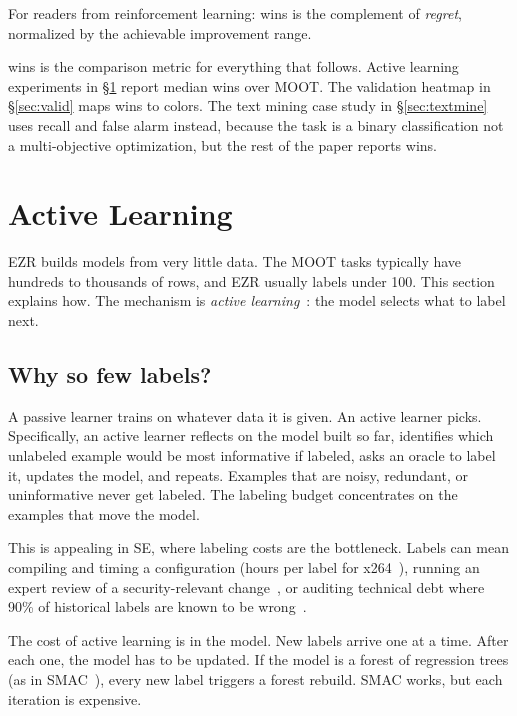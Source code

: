 \documentclass[AMA,STIX2COL]{WileyNJDv5}
\newcommand{\IT}{{\sffamily EZR}}
\begin{document}
For readers from reinforcement learning: \textsf{wins} is the
complement of {\em regret}, normalized by the achievable
improvement range.

\textsf{wins} is the comparison metric for everything that
follows. Active learning experiments in \S\ref{sec:active}
report median \textsf{wins} over MOOT. The validation heatmap
in \S\ref{sec:valid} maps \textsf{wins} to colors. The text
mining case study in \S\ref{sec:textmine} uses recall and false
alarm instead, because the task is a binary classification not
a multi-objective optimization, but the rest of the paper
reports \textsf{wins}.

\section{Active Learning}\label{sec:active}

\IT{} builds models from very little data. The MOOT tasks
typically have hundreds to thousands of rows, and \IT{} usually
labels under 100. This section explains how. The mechanism is
{\em active learning}~\cite{settles2009active,van2020survey}:
the model selects what to label next.

\subsection{Why so few labels?}

A passive learner trains on whatever data it is given. An active
learner picks. Specifically, an active learner reflects on the
model built so far, identifies which unlabeled example would be
most informative if labeled, asks an oracle to label it, updates
the model, and repeats. Examples that are noisy, redundant, or
uninformative never get labeled. The labeling budget concentrates
on the examples that move the model.

This is appealing in SE, where labeling costs are the bottleneck.
Labels can mean compiling and timing a configuration (hours per
label for x264~\cite{DBLP:conf/wosp/ValovPGFC17}), running an
expert review of a security-relevant change~\cite{hours39}, or
auditing technical debt where 90\% of historical labels are
known to be wrong~\cite{td71}.

The cost of active learning is in the model. New labels arrive
one at a time. After each one, the model has to be updated. If
the model is a forest of regression trees (as in
SMAC~\cite{hutter2011sequential}), every new label triggers a
forest rebuild. SMAC works, but each iteration is expensive.
\end{document}
